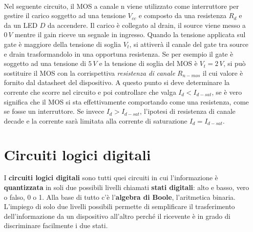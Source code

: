 \documentclass[12pt, a4paper]{report}
\begin{document}
\\Nel seguente circuito, il MOS a canale n viene utilizzato come interruttore per gestire il carico soggetto ad una tensione $V_{cc}$ e composto da una resistenza $R_{d}$ e da un LED $D$ da accendere. Il carico è collegato al drain, il source viene messo a $0\,V$ mentre il gain riceve un segnale in ingresso. Quando la tensione applicata sul gate è maggiore della tensione di soglia $V_{t}$, si attiverà il canale del gate tra source e drain trasformandolo in una opportuna resistenza. Se per esempio il gate è soggetto ad una tensione di $5\,V$ e la tensione di soglia del MOS è $V_{t} = 2\,V$, si può sostituire il MOS con la corrispettiva \textit{resistenza di canale} $R_{n-mos}$ il cui valore è fornito dal datasheet del dispositivo. A questo punto si deve determinare la corrente che scorre nel circuito e poi controllare che valga $I_{d} < I_{d-sat}$, se è vero significa che il MOS si sta effettivamente comportando come una resistenza, come se fosse un interruttore. Se invece $I_{d} > I_{d-sat}$, l'ipotesi di resistenza di canale decade e la corrente sarà limitata alla corrente di saturazione $I_{d} = I_{d-sat}$.

\chapter{Circuiti logici digitali}
I \textbf{circuiti logici digitali} sono tutti quei circuiti in cui l'informazione è \textbf{quantizzata} in soli due possibili livelli chiamati \textbf{stati digitali}: alto e basso, vero o falso, 0 o 1. Alla base di tutto c'è l'\textbf{algebra di Boole}, l'aritmetica binaria. L'impiego di solo due livelli possibili permette di semplificare il trasferimento dell'informazione da un dispositivo all'altro perché il ricevente è in grado di discriminare facilmente i due stati.
\end{document}
